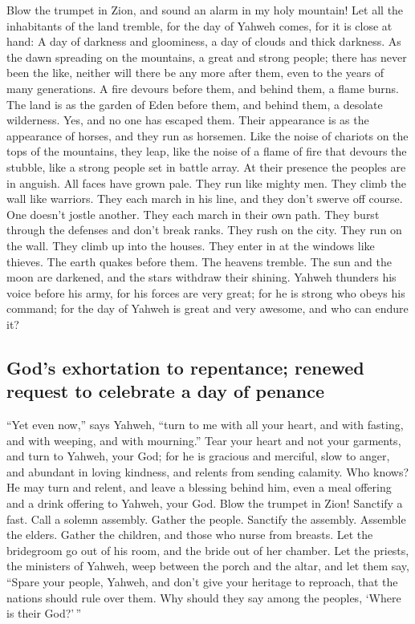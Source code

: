  Blow the trumpet in Zion, and sound an alarm in my holy
mountain! Let all the inhabitants of the land tremble, for the day of
Yahweh comes, for it is close at hand:  A day of darkness
and gloominess, a day of clouds and thick darkness. As the dawn
spreading on the mountains, a great and strong people; there has never
been the like, neither will there be any more after them, even to the
years of many generations.  A fire devours before them,
and behind them, a flame burns. The land is as the garden of Eden before
them, and behind them, a desolate wilderness. Yes, and no one has
escaped them.  Their appearance is as the appearance of
horses, and they run as horsemen.  Like the noise of
chariots on the tops of the mountains, they leap, like the noise of a
flame of fire that devours the stubble, like a strong people set in
battle array.  At their presence the peoples are in
anguish. All faces have grown pale.  They run like mighty
men. They climb the wall like warriors. They each march in his line, and
they don't swerve off course.  One doesn't jostle another.
They each march in their own path. They burst through the defenses and
don't break ranks.  They rush on the city. They run on the
wall. They climb up into the houses. They enter in at the windows like
thieves.  The earth quakes before them. The heavens
tremble. The sun and the moon are darkened, and the stars withdraw their
shining.  Yahweh thunders his voice before his army, for
his forces are very great; for he is strong who obeys his command; for
the day of Yahweh is great and very awesome, and who can endure it?

\hypertarget{gods-exhortation-to-repentance-renewed-request-to-celebrate-a-day-of-penance}{%
\subsection{God's exhortation to repentance; renewed request to
celebrate a day of
penance}\label{gods-exhortation-to-repentance-renewed-request-to-celebrate-a-day-of-penance}}

 ``Yet even now,'' says Yahweh, ``turn to me with all
your heart, and with fasting, and with weeping, and with mourning.''
 Tear your heart and not your garments, and turn to
Yahweh, your God; for he is gracious and merciful, slow to anger, and
abundant in loving kindness, and relents from sending calamity.
 Who knows? He may turn and relent, and leave a blessing
behind him, even a meal offering and a drink offering to Yahweh, your
God.  Blow the trumpet in Zion! Sanctify a fast. Call a
solemn assembly.  Gather the people. Sanctify the
assembly. Assemble the elders. Gather the children, and those who nurse
from breasts. Let the bridegroom go out of his room, and the bride out
of her chamber.  Let the priests, the ministers of
Yahweh, weep between the porch and the altar, and let them say, ``Spare
your people, Yahweh, and don't give your heritage to reproach, that the
nations should rule over them. Why should they say among the peoples,
`Where is their God?'\,''

